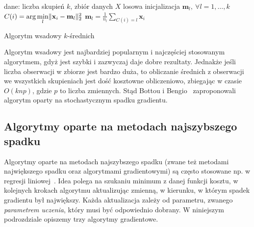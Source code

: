 \documentclass{praca1}
\DeclarePairedDelimiter{\norm}{\lVert}{\rVert}
\begin{document}
\begin{algorithm}[!h]
\begin{algorithmic}[1]
		\State dane: liczba skupień $k$, zbiór danych $X$
        \State losowa inicjalizacja $\mathbf{m}_l , \ \forall l=1, \ldots, k$
        \Repeat
                \State $C(i) = \arg \min\limits_{l} \norm{\mathbf{x}_i - \mathbf{m}_l }_2^2 $
            \EndFor
                \State $\mathbf{m}_l = \frac{1}{n_l}\sum\limits_{C(i) = l} \mathbf{x}_i$
            \EndFor

\end{algorithmic}
\caption{Algorytm wsadowy $k$-średnich}\label{alg:001}
\end{algorithm}

Algorytm wsadowy jest najbardziej popularnym i najczęściej stosowanym algorytmem, gdyż jest szybki i zazwyczaj daje dobre rezultaty. Jednakże jeśli liczba obserwacji w zbiorze jest bardzo duża, to obliczanie średnich z obserwacji we wszystkich skupieniach jest dość kosztowne obliczeniowo, zbiegając w czasie $O(knp)$, gdzie $p$ to liczba zmiennych. Stąd Bottou i Bengio~\cite{Bottou1995:convergenceproperties} zaproponowali algorytm oparty na stochastycznym spadku gradientu.

\subsection{Algorytmy oparte na metodach najszybszego spadku}

Algorytmy oparte na metodach najszybszego spadku (zwane też metodami największego spadku oraz algorytmami gradientowymi) są często stosowane np. w regresji liniowej~\cite{Bottou2012:sgdtricks}. Idea polega na szukaniu minimum z danej funkcji kosztu, w kolejnych krokach algorytmu aktualizując zmienną, w kierunku, w którym spadek gradientu był największy. Każda aktualizacja zależy od parametru, zwanego \emph{parametrem uczenia}, który musi być odpowiednio dobrany. W niniejszym podrozdziale opiszemy trzy algorytmy gradientowe.

\end{document}
